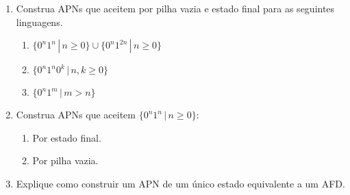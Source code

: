 \documentclass[a4paper]{article}
\theoremstyle{definition}
\begin{document}
  \begin{enumerate}
     \item Construa APNs que aceitem por pilha vazia e estado final para as seguintes linguagens.
       \begin{enumerate}
       \item $\{0^n1^n\,|\,n\geq 0\} \cup \{0^n1^{2n}\,|\,n\geq 0\}$
       \item $\{0^n1^n0^k\,|\,n,k \geq 0\}$
       \item $\{0^n1^m\,|\,m > n\}$
       \end{enumerate}
     \item Construa APNs que aceitem $\{0^n1^n\,|\,n\geq 0\}$:
       \begin{enumerate}
          \item Por estado final.
          \item Por pilha vazia.
          \end{enumerate}
     \item Explique como construir um APN de um único estado equivalente a um
       AFD.
  \end{enumerate}
\end{document}
